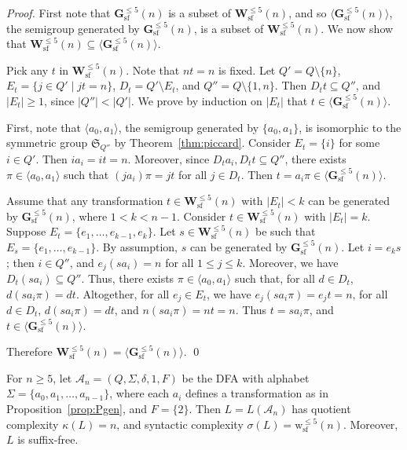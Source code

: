 \documentclass{llncs}
\renewcommand{\le}{\leqslant}
\renewcommand{\ge}{\geqslant}
\newcommand{\Sig}{\Sigma}
\newcommand{\cA}{{\mathcal A}}
\newcommand{\Vsf}{\mathbf{W}^{\le 5}_{\mathrm{sf}}}
\newcommand{\Gsf}{\mathbf{G}^{\le 5}_{\mathrm{sf}}}
\newcommand{\vsf}{{\mathrm{w}^{\le 5}_{\mathrm{sf}}}}
\begin{document}
\begin{proof}
First note that $\Gsf(n)$ is a subset of $\Vsf(n)$, and so $\langle \Gsf(n) \rangle$, the semigroup generated by $\Gsf(n)$, is a subset of $\Vsf(n)$. We now show that $\Vsf(n) \subseteq \langle \Gsf(n) \rangle$. 

Pick any $t$ in $\Vsf(n)$. Note that $nt = n$ is fixed. 
Let $Q' = Q \setminus \{n\}$, $E_t = \{j \in Q' \mid jt = n\}$,  $D_t = Q' \setminus E_t$, and $Q'' = Q \setminus \{1,n\}$. Then $D_t t \subseteq Q''$, and $|E_t| \ge 1$, since $|Q''| < |Q'|$.  We prove by induction on $|E_t|$ that $t \in \langle \Gsf(n) \rangle$. 

First, note that $\langle a_0,a_1 \rangle$, the semigroup generated by $\{a_0,a_1\}$, is isomorphic to the symmetric group $\mathfrak{S}_{Q''}$ by Theorem~\ref{thm:piccard}. Consider $E_t = \{i\}$ for some $i \in Q'$. Then $ia_i = it = n$. Moreover, since $D_t a_i, D_t t \subseteq Q''$, there exists $\pi \in \langle a_0, a_1 \rangle$ such that $(ja_i)\pi = jt$ for all $j \in D_t$. Then $t = a_i\pi \in \langle \Gsf(n) \rangle$.

Assume that any transformation $t \in \Vsf(n)$ with $|E_t| < k$ can be generated by $\Gsf(n)$, where $1 < k < n-1$. 
Consider $t \in \Vsf(n)$ with $|E_t| = k$. 
Suppose $E_t = \{e_1,\ldots,e_{k-1},e_k\}$. 
Let $s\in \Vsf(n)$ be such that $E_s = \{e_1,\ldots,e_{k-1}\}$. By assumption, $s$ can be generated by $\Gsf(n)$. 
Let $i = e_ks$; 
then $i \in Q''$, and $e_j(s a_i) = n$ for all $1 \le j \le k$. 
Moreover, we have $D_t (s a_i) \subseteq Q''$.
Thus, there exists $\pi \in \langle a_0, a_1 \rangle$ such that, 
for all $d \in D_t$, $d(s a_i \pi) = d t$. 
Altogether, for all $e_j \in E_t$, we have $e_j (s a_i \pi) = e_j t = n$, for all $d \in D_t$, $d (s a_i \pi) = d t$, and $n (s a_i \pi) = n t = n$. Thus $t = s a_i \pi$, and $t \in \langle \Gsf(n) \rangle$.


Therefore $\Vsf(n) = \langle \Gsf(n) \rangle$. \qed
\end{proof}

\begin{theorem}
\label{thm:DFAsf}
For $n \ge 5$, let $\cA_n = (Q,\Sig,\delta,1,F)$ be the DFA with alphabet $\Sig = \{a_0,a_1,\ldots,a_{n-1}\}$, where each $a_i$ defines a transformation as in Proposition~\ref{prop:Pgen}, and $F = \{2\}$. 
Then $L = L(\cA_n)$ has quotient complexity $\kappa(L) = n$, and syntactic complexity $\sigma(L) = \vsf(n)$. Moreover, $L$ is suffix-free.
\end{theorem}
\end{document}
